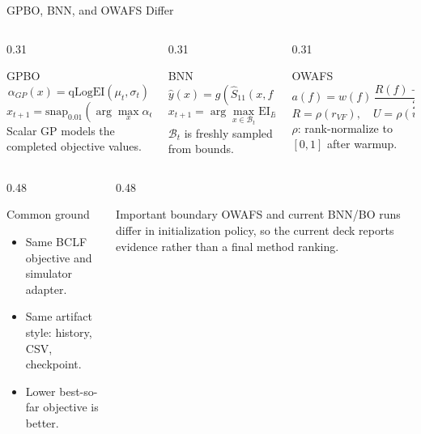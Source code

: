\documentclass[aspectratio=169,10pt]{beamer}
\begin{document}
\begin{frame}{GPBO, BNN, and OWAFS Differ}
  \footnotesize
  \begin{columns}[T,onlytextwidth]
    \begin{column}{0.31\textwidth}
      \begin{block}{GPBO}
        \scriptsize
        \[
          \alpha_{GP}(x)=\mathrm{qLogEI}(\mu_t,\sigma_t)
        \]
        \[
          x_{t+1}=\mathrm{snap}_{0.01}
          \left(\arg\max_x \alpha_{GP}(x)\right)
        \]
        Scalar GP models the completed objective values.
      \end{block}
    \end{column}
    \begin{column}{0.31\textwidth}
      \begin{block}{BNN}
        \scriptsize
        \[
          \hat y(x)=g(\hat S_{11}(x,f),\hat S_{21}(x,f))
        \]
        \[
          x_{t+1}=\arg\max_{x\in\mathcal B_t}
          \mathrm{EI}_{BNN}(x)
        \]
        $\mathcal B_t$ is freshly sampled from bounds.
      \end{block}
    \end{column}
    \begin{column}{0.31\textwidth}
      \begin{block}{OWAFS}
        \scriptsize
        \[
          a(f)=w(f)\,\frac{R(f)+U(f)}{2}
        \]
        \[
          R=\rho(r_{VF}),\quad U=\rho(u_{BNN})
        \]
        $\rho$: rank-normalize to $[0,1]$ after warmup.
      \end{block}
    \end{column}
  \end{columns}

  \vspace{0.28cm}
  \begin{columns}[T,onlytextwidth]
    \begin{column}{0.48\textwidth}
      \begin{block}{Common ground}
        \begin{itemize}
          \item Same BCLF objective and simulator adapter.
          \item Same artifact style: history, CSV, checkpoint.
          \item Lower best-so-far objective is better.
        \end{itemize}
      \end{block}
    \end{column}
    \begin{column}{0.48\textwidth}
      \begin{block}{Important boundary}
        OWAFS and current BNN/BO runs differ in initialization policy, so the
        current deck reports evidence rather than a final method ranking.
      \end{block}
    \end{column}
  \end{columns}
\end{frame}
\end{document}
